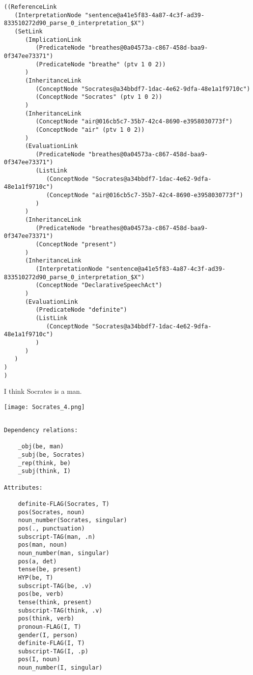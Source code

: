 \begin{verbatim}
((ReferenceLink
   (InterpretationNode "sentence@a41e5f83-4a87-4c3f-ad39-833510272d90_parse_0_interpretation_$X")
   (SetLink
      (ImplicationLink
         (PredicateNode "breathes@0a04573a-c867-458d-baa9-0f347ee73371")
         (PredicateNode "breathe" (ptv 1 0 2))
      )
      (InheritanceLink
         (ConceptNode "Socrates@a34bbdf7-1dac-4e62-9dfa-48e1a1f9710c")
         (ConceptNode "Socrates" (ptv 1 0 2))
      )
      (InheritanceLink
         (ConceptNode "air@016cb5c7-35b7-42c4-8690-e3958030773f")
         (ConceptNode "air" (ptv 1 0 2))
      )
      (EvaluationLink
         (PredicateNode "breathes@0a04573a-c867-458d-baa9-0f347ee73371")
         (ListLink
            (ConceptNode "Socrates@a34bbdf7-1dac-4e62-9dfa-48e1a1f9710c")
            (ConceptNode "air@016cb5c7-35b7-42c4-8690-e3958030773f")
         )
      )
      (InheritanceLink
         (PredicateNode "breathes@0a04573a-c867-458d-baa9-0f347ee73371")
         (ConceptNode "present")
      )
      (InheritanceLink
         (InterpretationNode "sentence@a41e5f83-4a87-4c3f-ad39-833510272d90_parse_0_interpretation_$X")
         (ConceptNode "DeclarativeSpeechAct")
      )
      (EvaluationLink
         (PredicateNode "definite")
         (ListLink
            (ConceptNode "Socrates@a34bbdf7-1dac-4e62-9dfa-48e1a1f9710c")
         )
      )
   )
)
)
\end{verbatim}


  I think Socrates is a man.

\texttt{[image: Socrates\_4.png]}

\begin{verbatim}

Dependency relations:

    _obj(be, man)
    _subj(be, Socrates)
    _rep(think, be)
    _subj(think, I)

Attributes:

    definite-FLAG(Socrates, T)
    pos(Socrates, noun)
    noun_number(Socrates, singular)
    pos(., punctuation)
    subscript-TAG(man, .n)
    pos(man, noun)
    noun_number(man, singular)
    pos(a, det)
    tense(be, present)
    HYP(be, T)
    subscript-TAG(be, .v)
    pos(be, verb)
    tense(think, present)
    subscript-TAG(think, .v)
    pos(think, verb)
    pronoun-FLAG(I, T)
    gender(I, person)
    definite-FLAG(I, T)
    subscript-TAG(I, .p)
    pos(I, noun)
    noun_number(I, singular)

\end{verbatim}


